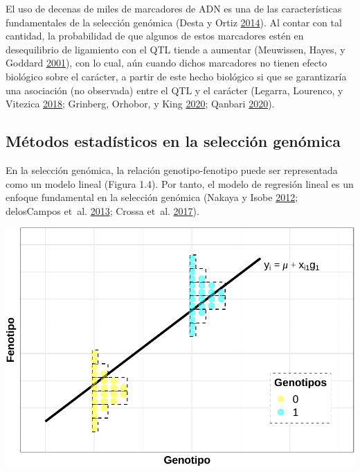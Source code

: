 \documentclass[11pt,spanish,a4paper,oneside,]{book} %
\begin{document}
El uso de decenas de miles de marcadores de ADN es una de las características fundamentales de la selección genómica (Desta y Ortiz \protect\hyperlink{ref-cite:10}{2014}). Al contar con tal cantidad, la probabilidad de que algunos de estos marcadores estén en desequilibrio de ligamiento con el QTL tiende a aumentar (Meuwissen, Hayes, y Goddard \protect\hyperlink{ref-cite:8}{2001}), con lo cual, aún cuando dichos marcadores no tienen efecto biológico sobre el carácter, a partir de este hecho biológico si que se garantizaría una asociación (no observada) entre el QTL y el carácter (Legarra, Lourenco, y Vitezica \protect\hyperlink{ref-cite:30}{2018}; Grinberg, Orhobor, y King \protect\hyperlink{ref-cite:35}{2020}; Qanbari \protect\hyperlink{ref-cite:36}{2020}).

\hypertarget{muxe9todos-estaduxedsticos-en-la-selecciuxf3n-genuxf3mica}{%
\subsection{Métodos estadísticos en la selección genómica}\label{muxe9todos-estaduxedsticos-en-la-selecciuxf3n-genuxf3mica}}

En la selección genómica, la relación genotipo-fenotipo puede ser representada como un modelo lineal (Figura 1.4). Por tanto, el modelo de regresión lineal es un enfoque fundamental en la selección genómica (Nakaya y Isobe \protect\hyperlink{ref-cite:6}{2012}; delosCampos et~al. \protect\hyperlink{ref-cite:31}{2013}; Crossa et~al. \protect\hyperlink{ref-cite:37}{2017}).

\begin{center}\includegraphics[width=1\linewidth]{figures/Mod_RL} \end{center}
\end{document}

